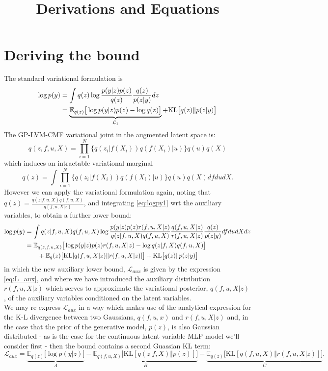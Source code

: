 \documentclass[12pt]{article}
\title{\textbf{Derivations and Equations}}
\date{}
\begin{document}
\maketitle


\section{Deriving the bound} %
\label{sec:derive_bound}
The standard variational formulation is
%
\begin{align}
    \log p(y) &= \int q(z)\log\frac{p(y|z)p(z)}{q(z)}\frac{q(z)}{p(z|y)} dz\notag\\
    &= \underbrace{\mathbb{E}_{q(z)}\big[ \log p(y|z)p(z) - \log q(z) \big]}_{\mathcal{L}_1} + \text{KL}\big[ q(z)\Vert p(z|y) \big]\label{eq:logpy1}
\end{align}
%
The GP-LVM-CMF variational joint in the augmented latent space is:
%
\begin{equation}
    q(z,f,u,X) = \prod_{i=1}^N \{q(z_i|f(X_i))q(f(X_i)|u)\}q(u)q(X)
\end{equation}
%
which induces an intractable variational marginal
%
\begin{equation}
    q(z) = \int \prod_{i=1}^N \{q(z_i|f(X_i))q(f(X_i)|u)\}q(u)q(X) df du dX.
\end{equation}
%
However we can apply the variational formulation again, noting that $q(z) = \frac{q(z|f,u,X)q(f,u,X)}{q(f,u,X|z)}$, and integrating \ref{eq:logpy1} wrt the auxiliary variables, to obtain a further lower bound:
\begin{align}
    \log p(y) &= \int q(z|f,u,X)q(f,u,X)\log \frac{p(y|z)p(z)r(f,u,X|z)}{q(z|f,u,X)q(f,u,X)}\frac{q(f,u,X|z)}{r(f,u,X|z)}\frac{q(z)}{p(z|y)} df du dX dz\notag\\
    &= \mathbb{E}_{q(z,f,u,X)}\big[ \log p(y|z)p(z)r(f,u,X|z) - \log q(z|f,X)q(f,u,X) \big]\label{eq:L_aux}\\
    &\qquad+ \mathbb{E}_q(z)\big[ \text{KL}[q(f,u,X|z)\Vert r(f,u,X|z)] \big] + \text{KL}\big[ q(z)\Vert p(z|y) \big]
\end{align}
%
in which the new auxiliary lower bound, $\mathcal{L}_{aux}$ is given by the expression \ref{eq:L_aux}, and where we have introduced the auxiliary distribution $r(f,u,X|z)$ which serves to approximate the variational posterior, $q(f,u,X|z)$, of the auxiliary variables conditioned on the latent variables.\\
We may re-express $\mathcal{L}_{aux}$ in a way which makes use of the analytical expression for the K-L divergence between two Gaussians, $q(f,u,x)$ and $r(f,u,X|z)$ and, in the case that the prior of the generative model, $p(z)$, is also Gaussian distributed - as is the case for the continuous latent variable MLP model we'll consider first - then the bound contains a second Guassian KL term:
%
\begin{equation}
    \mathcal{L}_{aux} = \underbrace{\mathbb{E}_{q(z)}\big[ \log p(y|z) \big]}_{A} - \underbrace{\mathbb{E}_{q(f,u,X)}\big[ \text{KL}[q(z|f,X)\Vert p(z)] \big]}_{B} - \underbrace{\mathbb{E}_{q(z)}\big[ \text{KL}[q(f,u,X)\Vert r(f,u,X|z)] \big]}_{C}.
\end{equation}
%
%
\end{document}
